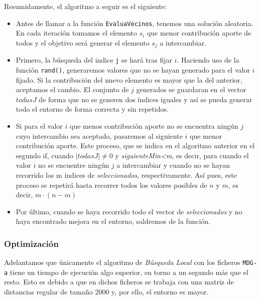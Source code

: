 \begin{enumerate}
	\newpage
	Resumidamente, el algoritmo a seguir es el siguiente: 
	\begin{itemize}
		\item Antes de llamar a la función \texttt{EvaluaVecinos}, tenemos una solución aleatoria. En cada iteración tomamos el elemento \texttt{$s_i$} que menor contribución aporte de todos y el objetivo será generar el elemento  \texttt{$s_j$} a intercambiar. 
		
		\item Primero, la búsqueda del indice \texttt{j} se hará tras fijar \texttt{$i$}.
		Haciendo uso de la función \texttt{rand()}, generaremos valores  que no se hayan generado para el valor \texttt{$i$} fijado. Si la contribución del nuevo elemento es mayor que la del anterior, aceptamos el cambio.
		El conjunto de \texttt{$j$} generados se guardaran en el vector \texttt{$todasJ$} de forma que no se generen dos índices iguales y así se pueda generar todo el entorno de forma correcta y sin repetidos.
		
		\item Si para el valor \texttt{$i$} que menos contribución aporte no se encuentra ningún \texttt{$j$} cuyo intercambio sea aceptado, pasaremos al siguiente \texttt{$i$} que menor contribución aporte. Este proceso, que se indica en el algoritmo anterior en el segundo if, cuando $|todasJ| \not=0$ y \textit{siguienteMin<m}, es decir, para cuando el valor \texttt{$i$} no se encuentre ningún \texttt{$j$} a intercambiar y cuando no se hayan recorrido los m índices de \textit{seleccionados}, respectivamente.
		Así pues, este proceso se repetirá hasta recorrer todos los valores posibles de \texttt{$n$} y \texttt{$m$}, es decir, $m \cdot (n-m)$
		
		\item Por último, cuando se haya recorrido todo el vector de \textit{seleccionados} y no haya encontrado mejora en el entorno, saldremos de la función.
	\end{itemize} 



	
	\subsubsection{Optimización}
	
	Adelantamos que únicamente el algoritmo de \textit{Búsqueda Local} con los ficheros \texttt{MDG-a} tiene un tiempo de ejecución algo superior, en torno a un segundo más que el resto. Esto es debido a que en dichos ficheros se trabaja con una matriz de distancias regular de tamaño 2000 y, por ello, el entorno es mayor.
	

\end{enumerate}
